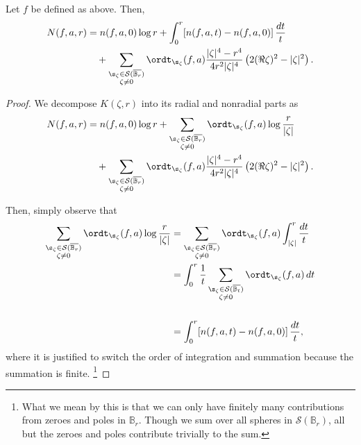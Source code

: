 \documentclass{amsart}
\begin{document}
\begin{prop}\label{quatIntCou2}
    Let $f$ be defined as above. Then, \begin{align*}N(f,a,r)&=n(f,a,0)\log r + \int_0^r[n(f,a,t)-n(f,a,0)]
    \,\frac{dt}{t} \\&\quad+\sum_{\substack{ \s_\zeta\in\mathcal{S}(\overline{\mathbb B_r}) \\ \zeta\neq 0}}\ordt_{\s_\zeta}(f,a) \frac{|\zeta|^4-r^4}{4r^2|\zeta|^4}\left(2(\Re \zeta)^2-|\zeta|^2\right).\end{align*}
\end{prop}
\begin{proof}
    We decompose $K(\zeta,r)$ into its radial and nonradial parts as \begin{align*}
        N(f,a,r)&=n(f,a,0)\log r+\sum_{\substack{ \s_\zeta\in\mathcal{S}(\overline{\mathbb B_r}) \\ \zeta\neq 0}}
       \ordt_{\s_\zeta}(f,a)\log\frac{r}{|\zeta|} \\ 
       &\quad+ \sum_{\substack{ \s_\zeta\in\mathcal{S}(\overline{\mathbb B_r}) \\ \zeta\neq 0}}\ordt_{\s_\zeta}(f,a)\frac{|\zeta|^4-r^4}{4r^2|\zeta|^4}\left(2(\Re \zeta)^2-|\zeta|^2\right). 
    \end{align*}
    
    Then, simply observe that
      \begin{align*}
    \sum_{\substack{ \s_\zeta\in\mathcal{S}(\overline{\mathbb B_r}) \\ \zeta\neq 0}}
       \ordt_{\s_\zeta}(f,a)\log\frac{r}{|\zeta|} 
    &= \sum_{\substack{ \s_\zeta\in\mathcal{S}(\overline{\mathbb B_r}) \\ \zeta\neq 0}}
       \ordt_{\s_\zeta}(f,a)\int_{|\zeta|}^r\frac{dt}{t} \\
    &= \int_0^r \frac{1}{t}\sum_{\substack{ \s_\zeta\in\mathcal{S}(\overline{\mathbb B_t}) \\ \zeta\neq 0}}
       \ordt_{\s_\zeta}(f,a)\,dt \\
       &\quad \\
    &= \int_0^r [n(f,a,t)-n(f,a,0)]\,\frac{dt}{t},
  \end{align*} where it is justified to switch the order of integration and summation because the summation is finite. \footnote{What we mean by this is that we can only have finitely many contributions from zeroes and poles in $\mathbb{B}_r$. Though we sum over all spheres in $\mathcal{S}(\mathbb B_r)$, all but the zeroes and poles contribute trivially to the sum.}
\end{proof}
\end{document}
